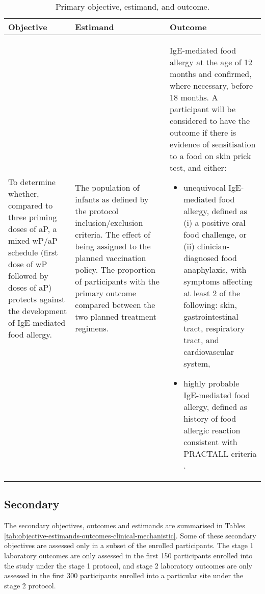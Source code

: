 \documentclass{bmcart}
\begin{document}
\begin{table}[h!]
	\caption{Primary objective, estimand, and outcome.}
	\label{tab:objective-estimands-outcomes-primary}
	\begin{tabular}{p{4cm}p{4cm}p{4cm}}
		Objective & Estimand & Outcome \\ \hline
		To determine whether, compared to three priming doses of aP, a mixed wP/aP schedule (first dose of wP followed by doses of aP) protects against the development of IgE-mediated food allergy.
	& The population of infants as defined by the protocol inclusion/exclusion criteria. \newline The effect of being assigned to the planned vaccination policy. \newline The proportion of participants with the primary outcome compared between the two planned treatment regimens.
		&
		IgE-mediated food allergy at the age of 12 months and confirmed, where necessary, before 18 months.
		A participant will be considered to have the outcome if there is evidence of sensitisation to a food on skin prick test, and either:
		\begin{itemize}
			\item unequivocal IgE-mediated food allergy, defined as (i) a positive oral food challenge, or (ii) clinician-diagnosed food anaphylaxis, with symptoms affecting at least 2 of the following: skin, gastrointestinal tract, respiratory tract, and cardiovascular system,
			\item highly probable IgE-mediated food allergy, defined as history of food allergic reaction consistent with PRACTALL criteria \cite{sampson2012standardizing}.
		\end{itemize} \\
		\hline
	\end{tabular}
\end{table}

\subsection*{Secondary}

The secondary objectives, outcomes and estimands are summarised in Tables \ref{tab:objective-estimands-outcomes-clinical-mechanistic}.
Some of these secondary objectives are assessed only in a subset of the enrolled participants.
The stage 1 laboratory outcomes are only assessed in the first 150 participants enrolled into the study under the stage 1 protocol, and stage 2 laboratory outcomes are only assessed in the first 300 participants enrolled into a particular site under the stage 2 protocol.
\end{document}
